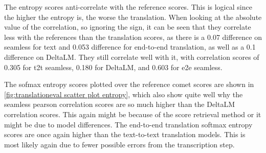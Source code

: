 The entropy scores anti-correlate with the reference scores. This is logical since the higher the entropy is, the worse the translation. 
When looking at the absolute value of the correlation, so ignoring the sign, it can be seen that they correlate less with the references than the translation scores, as there is a 0.07 difference on seamless for text and 0.053 difference for end-to-end translation, as well as a 0.1 difference on DeltaLM. They still correlate well with it, with correlation scores of 0.305 for t2t seamless, 0.180 for DeltaLM, and 0.603 for e2e seamless.

The sofmax entropy scores plotted over the reference comet scores are shown in \autoref{fig:translationeval scatter plot entropy}, which also show quite well why the seamless pearson correlation scores are so much higher than the DeltaLM correlation scores. This again might be because of the score retrieval method or it might be due to model differences. 
The end-to-end translation softmax entropy scores are once again higher than the text-to-text translation models. This is most likely again due to fewer possible errors from the transcription step.
